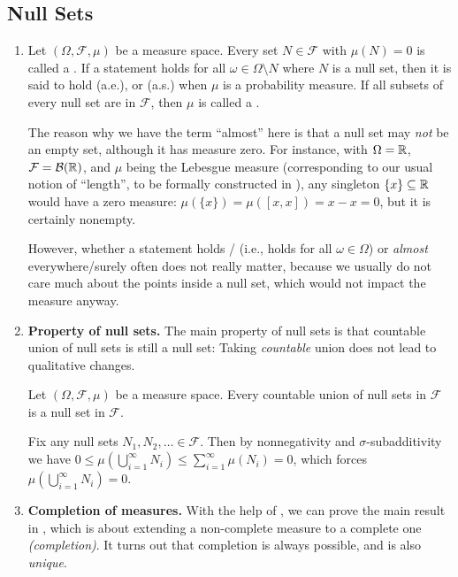 \subsection{Null Sets}
\label{subsect:null-sets}
\begin{enumerate}
\item Let \((\Omega,\mathcal{F},\mu)\) be a measure space. Every set
\(N\in\mathcal{F}\) with \(\mu(N)=0\) is called a . If
a statement holds for all \(\omega\in\Omega\setminus N\) where \(N\) is a null
set, then it is said to hold  (a.e.), or
 (a.s.) when \(\mu\) is a probability measure.
If all subsets of every null set are in \(\mathcal{F}\), then \(\mu\) is called
a .

The reason why we have the term ``almost'' here is that a null set may
\emph{not} be an empty set, although it has measure zero. For instance, with
\(\Omega=\mathbb{R}\), \(\mathcal{F}=\mathcal{B}(\mathbb{R})\), and \(\mu\) being the Lebesgue
measure (corresponding to our usual notion of ``length'', to be formally
constructed in ), any singleton \(\{x\}\subseteq
\mathbb{R}\) would have a zero measure: \(\mu(\{x\})=\mu([x,x])=x-x=0\), but it is
certainly nonempty.

However, whether a statement holds / (i.e., holds
for all \(\omega\in\Omega\)) or \emph{almost} everywhere/surely often does not
really matter, because we usually do not care much about the points inside a
null set, which would not impact the measure anyway.

\item \textbf{Property of null sets.} The main property of null sets is that
countable union of null sets is still a null set: Taking \emph{countable} union
does not lead to qualitative changes.

\begin{lemma}
\label{lma:count-union-null}
Let \((\Omega,\mathcal{F},\mu)\) be a measure space. Every countable union of null
sets in \(\mathcal{F}\) is a null set in \(\mathcal{F}\).
\end{lemma}
\begin{pf}
Fix any null sets \(N_1,N_2,\dotsc\in\mathcal{F}\). Then by nonnegativity and
\(\sigma\)-subadditivity we have \(0\le\mu(\bigcup_{i=1}^{\infty}N_i)
\le\sum_{i=1}^{\infty}\mu(N_i)=0\), which forces \(\mu(\bigcup_{i=1}^{\infty}N_i)=0\).
\end{pf}
\item \textbf{Completion of measures.}
With the help of , we can prove the main result in
, which is about extending a non-complete measure to a
complete one \emph{(completion)}. It turns out that completion is always
possible, and is also \emph{unique}.


\end{enumerate}
